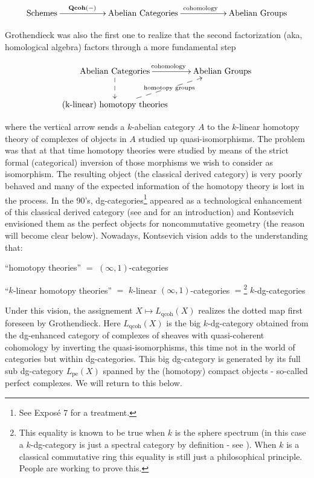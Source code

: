 \begin{refsection}
$$
\xymatrix{
\mathrm{Schemes} \ar[rr]^(0.4){\Qcoh(-)}&& \text{Abelian Categories}\ar[rr]^{\text{cohomology}}&& \text{Abelian Groups} 
}
$$

Grothendieck was also the first one to realize that the second factorization (aka, homological algebra) factors through a more fundamental step

$$
\xymatrix{
\text{Abelian Categories}\ar@{-->}[d]\ar[r]^{\text{cohomology}}& \text{Abelian Groups} \\
\text{(k-linear) homotopy theories}\ar@{-->}[ru]|-{\text{homotopy groups}}&
}
$$

\noindent where the vertical arrow sends a $k$-abelian category $A$ to the $k$-linear homotopy theory of complexes of objects in $A$ studied up quasi-isomorphisms. 
The problem was that at that time homotopy theories were studied by means of the strict formal (categorical) inversion of those morphisms we wish to consider as isomorphism. The resulting object (the classical derived category) is very poorly behaved and many of the expected information of the homotopy theory is lost in the process. In the 90's, dg-categories\footnote{See Expos\'e 7 for a treatment.} appeared as a technological enhancement of this classical derived category (see \cite{bondal-kapranov3,bondal-kapranov2,bondal-kapranov} and \cite{ondgcategories, sedano} for an introduction) and Kontsevich envisioned them as the perfect objects for noncommutative geometry (the reason will become clear below). Nowadays, Kontsevich vision adds to the understanding that:\\

\begin{center}
``homotopy theories'' $=$ $(\infty,1)$-categories\\
\end{center}

\begin{center}
``$k$-linear homotopy theories'' $=$ $k$-linear $(\infty,1)$-categories $=$\footnote{This equality is known to be true when $k$ is the sphere spectrum (in this case a $k$-dg-category is just a spectral category by definition - see \cite{tabuada-gepner}). When $k$ is a classical commutative ring this equality is still just a philosophical principle. People are working to prove this.} $k$-dg-categories\\
\end{center}


Under this vision, the assignement $X\mapsto L_{\mathrm{qcoh}}(X)$ realizes the dotted map first foreseen by Grothendieck. Here $L_{\mathrm{qcoh}}(X)$ is the big $k$-dg-category obtained from the dg-enhanced category of complexes of sheaves with quasi-coherent cohomology by inverting the quasi-isomorphisms, this time not in the world of categories but within dg-categories. This big dg-category is generated by its full sub dg-category $L_\mathrm{pe}(X)$ spanned by the (homotopy) compact objects - so-called perfect complexes. We will return to this below. \\


\end{refsection}
